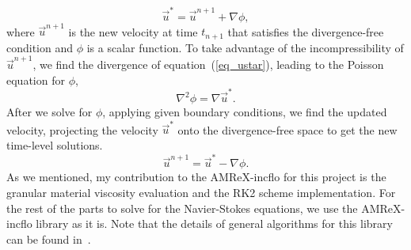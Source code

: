 \begin{equation}
  \vec{u}^* = \vec{u}^{n+1} + \nabla \phi,
  \label{eq_ustar}
\end{equation}
where $\vec{u}^{n+1}$ is the new velocity at time $t_{n+1}$ that satisfies the divergence-free condition and $\phi$ is a scalar function.
To take advantage of the incompressibility of $\vec{u}^{n+1}$, we find the divergence of equation~(\ref{eq_ustar}), leading to the Poisson equation for $\phi$,
\[
  \nabla^2 \phi = \nabla \vec{u}^*.  
\]
After we solve for $\phi$, applying given boundary conditions, we find the updated velocity, projecting the velocity $\vec{u}^*$ onto the divergence-free space to get the new time-level solutions.
\[
  \vec{u}^{n+1} = \vec{u}^* - \nabla \phi.
\]
As we mentioned, my contribution to the AMReX-incflo for this project is the granular material viscosity evaluation and the RK2 scheme implementation. For the rest of the parts to solve for the Navier-Stokes equations, we use the AMReX-incflo library as it is. Note that the details of general algorithms for this library can be found in~\cite{almgren_conservative_1998}.


